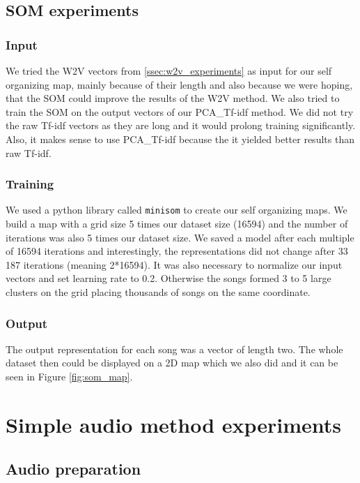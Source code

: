 \subsection{SOM experiments}\label{ssec:som_experiments}

\subsubsection{Input}
We tried the W2V vectors from \ref{ssec:w2v_experiments} as input for our self organizing map, mainly because of their length and also because we were hoping, that the SOM could improve the results of the W2V method. We also tried to train the SOM on the output vectors of our PCA\_Tf-idf method. We did not try the raw Tf-idf vectors as they are long and it would prolong training significantly. Also, it makes sense to use PCA\_Tf-idf because the it yielded better results than raw Tf-idf.

\subsubsection{Training}
We used a python library called \texttt{minisom} \cite{Vettigli2019} to create our self organizing maps. We build a map with a grid size 5 times our dataset size (16594) and the number of iterations was also 5 times our dataset size. We saved a model after each multiple of 16594 iterations and interestingly, the representations did not change after 33 187 iterations (meaning 2*16594). It was also necessary to normalize our input vectors and set learning rate to 0.2. Otherwise the songs formed 3 to 5 large clusters on the grid placing thousands of songs on the same coordinate. 

\subsubsection{Output}
The output representation for each song was a vector of length two. The whole dataset then could be displayed on a 2D map which we also did and it can be seen in Figure \ref{fig:som_map}. 

\section{Simple audio method experiments}\label{sec:simple_audio_experiments}

\subsection{Audio preparation}\label{ssec:audio_prep}

